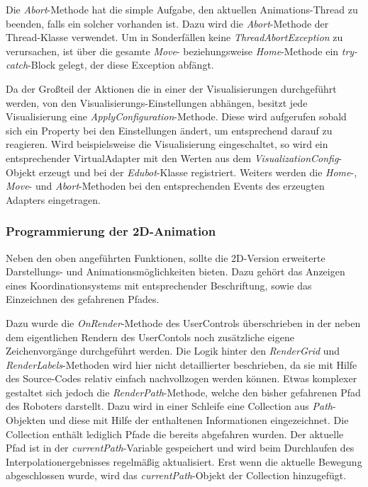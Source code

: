Die \textit{Abort}-Methode hat die simple Aufgabe, den aktuellen Animations-Thread zu beenden, falls ein solcher vorhanden ist. Dazu wird die \textit{Abort}-Methode der Thread-Klasse verwendet. Um in Sonderfällen keine \textit{ThreadAbortException} zu verursachen, ist über die gesamte \textit{Move}- beziehungsweise \textit{Home}-Methode ein \textit{try-catch}-Block gelegt, der diese Exception abfängt.

Da der Großteil der Aktionen die in einer der Visualisierungen durchgeführt werden, von den Visualisierungs-Einstellungen abhängen, besitzt jede Visualisierung eine \textit{ApplyConfiguration}-Methode. Diese wird aufgerufen sobald sich ein Property bei den Einstellungen ändert, um entsprechend darauf zu reagieren. Wird beispielsweise die Visualisierung eingeschaltet, so wird ein entsprechender VirtualAdapter mit den Werten aus dem \textit{VisualizationConfig}-Objekt erzeugt und bei der \textit{Edubot}-Klasse registriert. Weiters werden die \textit{Home}-, \textit{Move}- und \textit{Abort}-Methoden bei den entsprechenden Events des erzeugten Adapters eingetragen.

\subsubsection{Programmierung der 2D-Animation}

Neben den oben angeführten Funktionen, sollte die 2D-Version erweiterte Darstellungs- und Animationsmöglichkeiten bieten. Dazu gehört das Anzeigen eines Koordinationsystems mit entsprechender Beschriftung, sowie das Einzeichnen des gefahrenen Pfades.

Dazu wurde die \textit{OnRender}-Methode des UserControls überschrieben in der neben dem eigentlichen Rendern des UserContols noch zusätzliche eigene Zeichenvorgänge durchgeführt werden.
Die Logik hinter den \textit{RenderGrid} und \textit{RenderLabels}-Methoden wird hier nicht detaillierter beschrieben, da sie mit Hilfe des Source-Codes relativ einfach nachvollzogen werden können.
Etwas komplexer gestaltet sich jedoch die \textit{RenderPath}-Methode, welche den bisher gefahrenen Pfad des Roboters darstellt. Dazu wird in einer Schleife eine Collection aus \textit{Path}-Objekten und diese mit Hilfe der enthaltenen Informationen eingezeichnet. Die Collection enthält lediglich Pfade die bereits abgefahren wurden. Der aktuelle Pfad ist in der \textit{currentPath}-Variable gespeichert und wird beim Durchlaufen des Interpolationergebnisses regelmäßig aktualisiert. Erst wenn die aktuelle Bewegung abgeschlossen wurde, wird das \textit{currentPath}-Objekt der Collection hinzugefügt.

